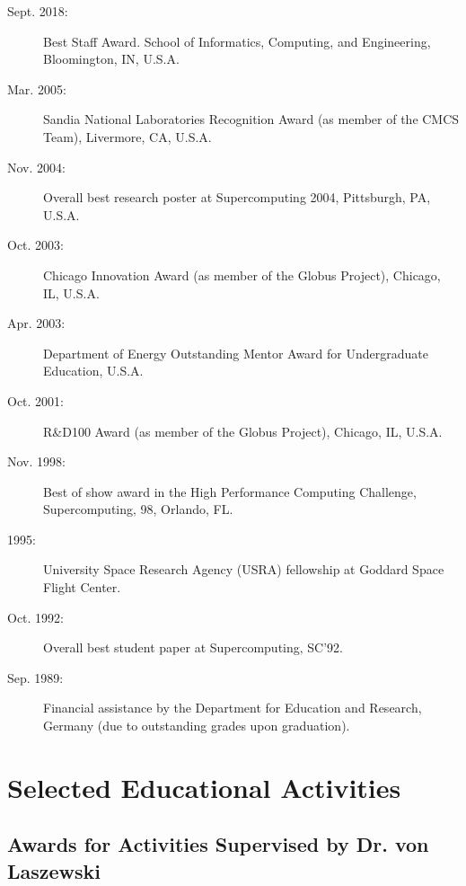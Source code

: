 \documentclass{article}
\begin{document}
\begin{description}
\item[Sept. 2018:]  	Best Staff Award. School of Informatics, Computing, and Engineering, 
Bloomington, IN, U.S.A. 

\item[Mar. 2005:]  	Sandia National Laboratories Recognition Award (as member of the CMCS   
  		Team), Livermore, CA, U.S.A. 

\item[Nov. 2004:]  	Overall best research poster at Supercomputing 2004, Pittsburgh, PA, U.S.A. 

\item[Oct. 2003:]  	Chicago Innovation Award (as member of the Globus Project), Chicago, IL, U.S.A. 

\item[Apr. 2003:] 	Department of Energy Outstanding Mentor Award for Undergraduate Education, U.S.A. 

\item[Oct. 2001:] 	R\&D100 Award (as member of the Globus Project), Chicago, IL, U.S.A. 

\item[Nov. 1998:] 	Best of show award in the High Performance Computing Challenge,    
  		Supercomputing‚ 98, Orlando, FL. 

\item[1995:]  	University Space Research Agency (USRA) fellowship at Goddard Space Flight Center. 

\item[Oct. 1992:] 	Overall best student paper at Supercomputing‚ SC’92. 

\item[Sep. 1989:] 	Financial assistance by the Department for Education and Research, Germany  
(due to outstanding grades upon graduation).
\end{description}

\section{Selected Educational Activities} 
 
\subsection{Awards for Activities Supervised by Dr. von Laszewski}
\end{document}
